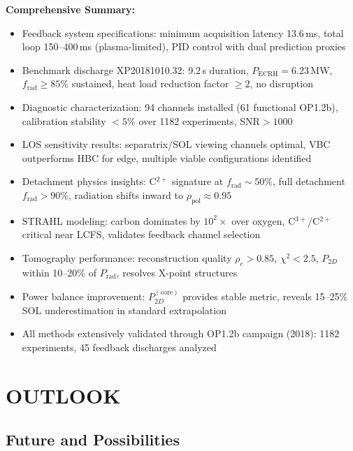 \documentclass[11pt,a4paper]{article}
\begin{document}
\textbf{Comprehensive Summary:}
\begin{itemize}
\item Feedback system specifications: minimum acquisition latency 13.6\,ms, total loop 150--400\,ms (plasma-limited), PID control with dual prediction proxies
\item Benchmark discharge XP20181010.32: 9.2\,s duration, $P_{\text{ECRH}}=6.23$\,MW, $f_{\text{rad}}\geq85\%$ sustained, heat load reduction factor $\geq2$, no disruption
\item Diagnostic characterization: 94 channels installed (61 functional OP1.2b), calibration stability $<5\%$ over 1182 experiments, SNR$>1000$
\item LOS sensitivity results: separatrix/SOL viewing channels optimal, VBC outperforms HBC for edge, multiple viable configurations identified
\item Detachment physics insights: C$^{2+}$ signature at $f_{\text{rad}}\sim50\%$, full detachment $f_{\text{rad}}>90\%$, radiation shifts inward to $\rho_{\text{pol}}\approx0.95$
\item STRAHL modeling: carbon dominates by $10^2\times$ over oxygen, C$^{3+}$/C$^{2+}$ critical near LCFS, validates feedback channel selection
\item Tomography performance: reconstruction quality $\rho_c>0.85$, $\chi^2<2.5$, $P_{2D}$ within 10--20\% of $P_{\text{rad}}$, resolves X-point structures
\item Power balance improvement: $P_{2D}^{(\text{core})}$ provides stable metric, reveals 15--25\% SOL underestimation in standard extrapolation
\item All methods extensively validated through OP1.2b campaign (2018): 1182 experiments, 45 feedback discharges analyzed
\end{itemize}

\section{OUTLOOK}

\subsection{Future and Possibilities}
\end{document}
